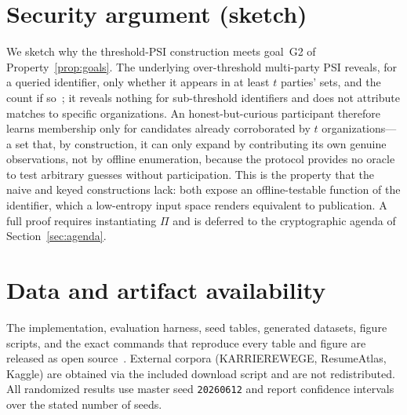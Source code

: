 \documentclass[11pt]{article}
\begin{document}
\section{Security argument (sketch)}\label{app:security}
We sketch why the threshold-PSI construction meets goal~G2 of
Property~\ref{prop:goals}. The underlying over-threshold multi-party PSI reveals,
for a queried identifier, only whether it appears in at least $t$ parties' sets,
and the count if so~\cite{otpsi2026}; it reveals nothing for sub-threshold
identifiers and does not attribute matches to specific organizations. An
honest-but-curious participant therefore learns membership only for candidates
already corroborated by $t$ organizations---a set that, by construction, it can
only expand by contributing its own genuine observations, not by offline
enumeration, because the protocol provides no oracle to test arbitrary guesses
without participation. This is the property that the naive and keyed constructions
lack: both expose an offline-testable function of the identifier, which a
low-entropy input space renders equivalent to publication. A full proof requires
instantiating $\Pi$ and is deferred to the cryptographic agenda of
Section~\ref{sec:agenda}.

\section*{Data and artifact availability}
The implementation, evaluation harness, seed tables, generated datasets, figure
scripts, and the exact commands that reproduce every table and figure are released
as open source~\cite{truthhirecode}. External corpora (KARRIEREWEGE, ResumeAtlas,
Kaggle) are obtained via the included download script and are not redistributed.
All randomized results use master seed \texttt{20260612} and report confidence
intervals over the stated number of seeds.
\end{document}
